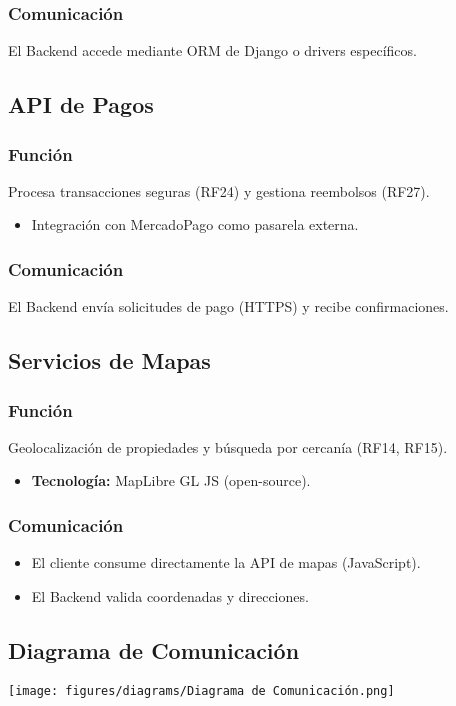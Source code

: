		\subsubsection*{Comunicación}
			El Backend accede mediante ORM de Django o drivers específicos.
	
	\subsection{API de Pagos}
		\subsubsection*{Función}
			Procesa transacciones seguras (RF24) y gestiona reembolsos (RF27).
			
			\begin{itemize}
				\item Integración con MercadoPago como pasarela externa.
			\end{itemize}
		
		\subsubsection*{Comunicación}
			El Backend envía solicitudes de pago (HTTPS) y recibe confirmaciones.
	
	\subsection{Servicios de Mapas}
		\subsubsection*{Función}
			Geolocalización de propiedades y búsqueda por cercanía (RF14, RF15).
			
			\begin{itemize}
				\item \textbf{Tecnología:} MapLibre GL JS (open-source).
			\end{itemize}
	
		\subsubsection*{Comunicación}
			\begin{itemize}
				\item El cliente consume directamente la API de mapas (JavaScript).
				\item El Backend valida coordenadas y direcciones.
			\end{itemize}
	
	\newpage
	\subsection{Diagrama de Comunicación}
		\begin{center}
			\texttt{[image: figures/diagrams/Diagrama de Comunicación.png]}
			\label{fig:img1}
		\end{center}